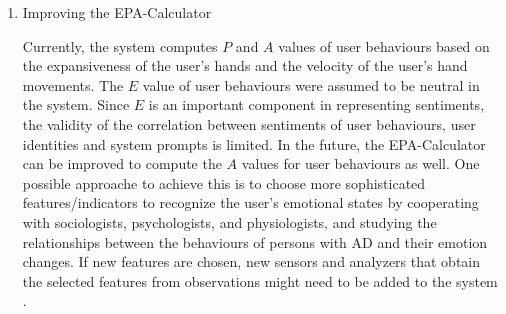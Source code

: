 \begin{enumerate}

\item{Improving the EPA-Calculator}

Currently, the system computes $P$ and $A$ values of user behaviours based on the expansiveness of the user's hands and the velocity of the user's hand movements. The $E$ value of user behaviours were assumed to be neutral in the system. Since $E$ is an important component in representing sentiments, the validity of the correlation between sentiments of user behaviours, user identities and system prompts is limited. In the future, the EPA-Calculator can be improved to compute the $A$ values for user behaviours as well. One possible approache to achieve this is to choose more sophisticated features/indicators to recognize the user's emotional states by cooperating with sociologists, psychologists, and physiologists, and studying the relationships between the behaviours of persons with AD and their emotion changes. If new features are chosen, new sensors and analyzers that obtain the selected features from observations might need to be added to the system .


\end{enumerate}
